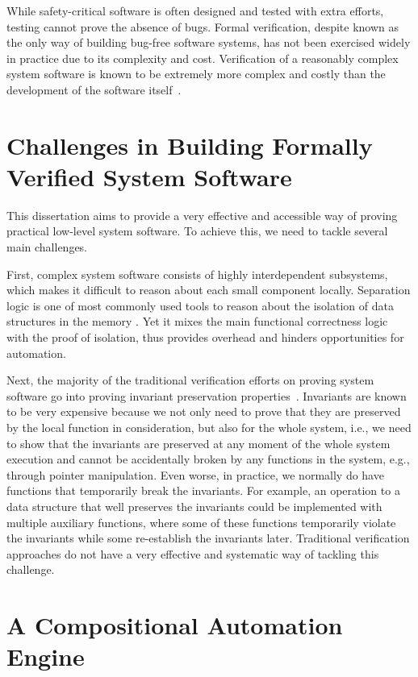 While safety-critical software is often designed and tested with extra efforts, testing cannot
prove the absence of bugs. Formal verification, despite known as the only way of building
bug-free software systems, has not been exercised widely in practice due to its complexity and cost.
Verification of a reasonably complex system software is known to be extremely more complex and
costly than the development of the software itself~\cite{klein2009sel4,klein14}.


\section{Challenges in Building Formally Verified System Software}

This dissertation aims to provide a very effective and accessible way of proving practical low-level
system software. To achieve this, we need to tackle several main challenges.

First, complex system software consists of highly interdependent subsystems, which makes it
difficult to reason about each small component locally. Separation logic is one of most commonly
used tools to reason about the isolation of data structures in the memory
\cite{appel07:tphols,Tuch:2009}. Yet it mixes the main functional correctness logic with the proof
of isolation, thus provides overhead and hinders opportunities for automation.

Next, the majority of the traditional verification efforts on proving system software go into proving
invariant preservation properties~\cite{klein14}. Invariants are known to be very expensive
because we not only need to prove that they are preserved by the local function in consideration,
but also for the whole system, i.e., we need to show that the invariants are preserved at any
moment of the whole system execution and cannot be accidentally broken by any functions
in the system, e.g., through pointer manipulation. Even worse, in practice, we normally do
have functions that temporarily break the invariants. For example, an operation to a data structure
that well preserves the invariants could be implemented with multiple auxiliary functions, where
some of these functions temporarily violate the invariants while some re-establish
the invariants later. Traditional verification approaches
do not have a very effective and systematic way of tackling this challenge.

\section{A Compositional Automation Engine} 

